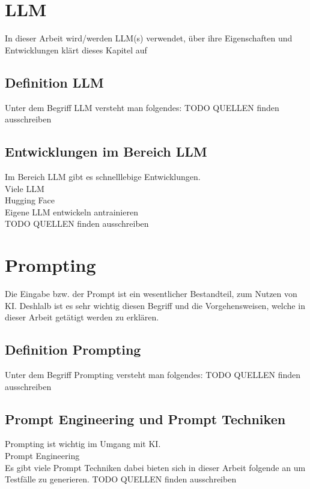 \documentclass[12pt,toc=bib,toc=listof]{scrreprt}
\begin{document}
\section{LLM} %
\label{sec:llm}
In dieser Arbeit wird/werden LLM(s) verwendet, über ihre Eigenschaften und Entwicklungen klärt dieses Kapitel auf

\subsection{Definition LLM} %
\label{sec:definitionLLM}
Unter dem Begriff LLM versteht man folgendes:
TODO QUELLEN finden ausschreiben

\subsection{Entwicklungen im Bereich LLM} %
\label{sec:entwicklungenImBereichLLM}
Im Bereich LLM gibt es schnelllebige Entwicklungen.\\
Viele LLM\\
Hugging Face\\
Eigene LLM entwickeln antrainieren\\
TODO QUELLEN finden ausschreiben

\section{Prompting} %
\label{sec:prompting}
Die Eingabe bzw. der Prompt ist ein wesentlicher Bestandteil, zum Nutzen von KI. Deshlalb ist es sehr wichtig diesen Begriff und die Vorgehensweisen, welche in dieser Arbeit getätigt werden zu erklären.

\subsection{Definition Prompting} %
\label{sec:definitionPrompting}
Unter dem Begriff Prompting versteht man folgendes:
TODO QUELLEN finden ausschreiben

\subsection{Prompt Engineering und Prompt Techniken} %
\label{sec:promptEngineeringUndPromptTechniken}
Prompting ist wichtig im Umgang mit KI.\\
Prompt Engineering\\
Es gibt viele Prompt Techniken dabei bieten sich in dieser Arbeit folgende an um Testfälle zu generieren.
TODO QUELLEN finden ausschreiben
\end{document}
